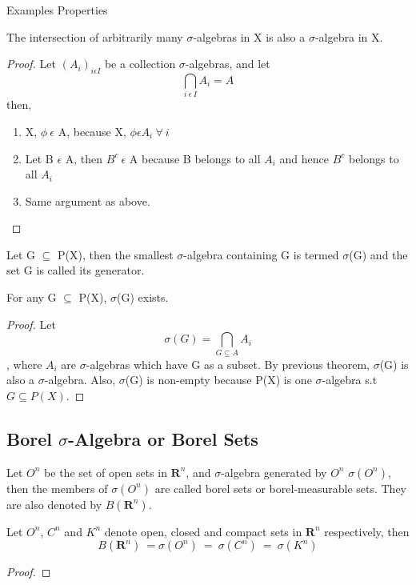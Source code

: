 Examples
Properties
\begin{theorem}
    The intersection of arbitrarily many $\sigma$-algebras in X is also a
    $\sigma$-algebra in X.
\end{theorem}
\begin{proof}
    Let $(A_i)_{i \epsilon I}$ be a collection $\sigma$-algebras, and let
    \[
        \bigcap_{i \: \epsilon \: I}A_i = A
    \]
    then,
    \begin{enumerate}
        \item X, $\phi \: \epsilon$ A, because X, $\phi \epsilon A_i \: \forall
        \: i$
        \item Let B $\epsilon$ A, then $B^c \: \epsilon$ A because B belongs to
            all $A_i$ and hence $B^c$ belongs to all $A_i$
        \item Same argument as above.
    \end{enumerate}
\end{proof}
\begin{definition}
    Let G $\subseteq$ P(X), then the smallest $\sigma$-algebra containing G is
    termed $\sigma$(G) and the set G is called its generator.
\end{definition}
\begin{theorem}
    For any G $\subseteq$ P(X), $\sigma$(G) exists.
\end{theorem}
\begin{proof}
    Let 
    \[
        \sigma(G) = \bigcap_{G \subseteq A} A_i
    \]
    , where $A_i$ are $\sigma$-algebras which have G as a subset. By previous
    theorem, $\sigma$(G) is also a $\sigma$-algebra. Also, $\sigma$(G) is
    non-empty because P(X) is one $\sigma$-algebra s.t $G \subseteq P(X)$.
\end{proof}

\subsection{Borel $\sigma$-Algebra or Borel Sets}
\begin{definition}
    Let $O^n$ be the set of open sets in $\bm{R}^n$, and  $\sigma$-algebra
    generated by $O^n$ $\sigma(O^n)$, then the members of $\sigma(O^n)$ are
    called borel sets or borel-measurable sets. They are also denoted by
    $B(\bm{R}^n)$.
\end{definition}
\begin{theorem}
    Let $O^n$, $C^n$ and $K^n$ denote open, closed and compact sets in
    $\bm{R}^n$ respectively, then
    \[
        B(\bm{R}^n) \: = \sigma(O^n) \: = \: \sigma(C^n) \: = \: \sigma(K^n)
    \]
\end{theorem}
\begin{proof}
\end{proof}

